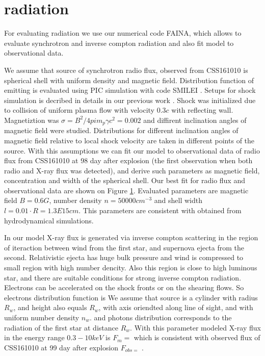 \documentclass[a4paper,12pt]{extreport}
\begin{document}
\section{radiation}
For evaluating radiation we use our numerical code FAINA, which allows to evaluate synchrotron and inverse compton radiation and also fit model to observational data. 

We assume that source of synchrotron radio flux, observed from CSS161010 is spherical shell with uniform density and magnetic field. Distribution function of emitting is evaluated using PIC simulation with code SMILEI \cite{Derouillat}. Setups for shock simulation is decribed in details in our previous work \cite{BykovUniverse}. Shock was initialized due to collision of uniform plasma flow with velocity $0.3 c$ with reflecting wall. Magnetiztion was $\sigma = B^2/4 pi m_p \gamma c^2 = 0.002$ and diffirent inclination angles of magnetic field were studied. Distributions for different inclination angles of magnetic field relative to local shock velocity are taken in different points of the source. With this assumptions we can fit our model to observational data of radio flux from CSS161010 at 98 day after explosion (the first observation when both radio and X-ray flux was detected), and derive such parameters as magnetic field, concentration and width of the spherical shell. Our best fit for radio flux and observational data are shown on Figure \ref{}. Evaluated parameters are magnetic field $B = 0.6 G$, number density $n = 50000{cm}^{-3}$ and shell width $l = 0.01\cdot R = 1.3E15 cm$. This parameters are consistent with obtained from hydrodynamical simulations.

In our model X-ray flux is generated via inverse compton scattering in the region of iteraction between wind from the first star, and supernova ejecta from the second. Relativistic ejecta has huge bulk pressure and wind is compressed to small region with high number dencity. Also this region is close to high luminous star, and there are suitable conditions for strong inverse compton radiation. Electrons can be accelerated on the shock fronts or on the shearing flows. So electrons distribution function is 
We assume that source is a cylinder with radius $R_w$, and height also equals $R_w$, with axis oriendted along line of sight, and with uniform number density $n_w$. 
and photons distribution corresponds to the radiation of the first star at distance $R_w$. With this parameter modeled X-ray flux in the energy range $0.3-10 keV$ is $F_m = $ which is consistent with observed flux of CSS161010 at 99 day after explosion $F_{obs = }$ \cite{Coppejans2020}.



\end{document}
